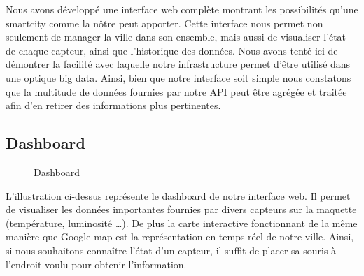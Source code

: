 Nous avons développé une interface web complète montrant les possibilités qu’une smartcity comme la nôtre peut apporter. Cette interface nous permet non seulement de manager la ville dans son ensemble, mais aussi de visualiser l’état de chaque capteur, ainsi que l’historique des données. Nous avons tenté ici de démontrer la facilité avec laquelle notre infrastructure permet d’être utilisé dans une optique big data. Ainsi, bien que notre interface soit simple nous constatons que la multitude de données fournies par notre API peut être agrégée et traitée afin d’en retirer des informations plus pertinentes.

\subsection{Dashboard}
\begin{figure}[H]
    \begin{center}

        \caption{Dashboard}
    \end{center}
\end{figure}
L’illustration ci-dessus représente le dashboard de notre interface web. Il permet de visualiser les données importantes fournies par divers capteurs sur la maquette (température, luminosité …). De plus la carte interactive fonctionnant de la même manière que Google map est la représentation en temps réel de notre ville. Ainsi, si nous souhaitons connaître l’état d’un capteur, il suffit de placer sa souris à l’endroit voulu pour obtenir l’information.
